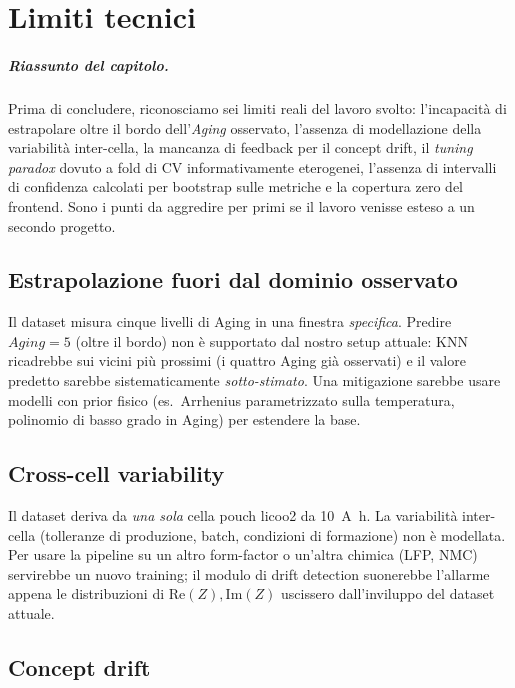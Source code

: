\chapter{Limiti tecnici}
\label{chap:conclusions}

\paragraph{Riassunto del capitolo.} Prima di concludere, riconosciamo
sei limiti reali del lavoro svolto: l'incapacità di estrapolare oltre
il bordo dell'\emph{Aging} osservato, l'assenza di modellazione della
variabilità inter-cella, la mancanza di feedback per il concept drift,
il \emph{tuning paradox} dovuto a fold di CV informativamente
eterogenei, l'assenza di intervalli di confidenza calcolati per
bootstrap sulle metriche e la copertura zero del frontend. Sono i punti
da aggredire per primi se il lavoro venisse esteso a un secondo
progetto.

\section{Estrapolazione fuori dal dominio osservato}

Il dataset misura cinque livelli di Aging in una finestra
\emph{specifica}. Predire $Aging = 5$ (oltre il bordo) non è supportato
dal nostro setup attuale: KNN ricadrebbe sui vicini più prossimi (i
quattro Aging già osservati) e il valore predetto sarebbe
sistematicamente \emph{sotto-stimato}. Una mitigazione sarebbe usare
modelli con prior fisico (es.~Arrhenius parametrizzato sulla
temperatura, polinomio di basso grado in Aging) per estendere la base.

\section{Cross-cell variability}

Il dataset deriva da \emph{una sola} cella pouch \acrshort{licoo2} da
\SI{10}{\ampere\hour}. La variabilità inter-cella (tolleranze di
produzione, batch, condizioni di formazione) non è modellata. Per usare
la pipeline su un altro form-factor o un'altra chimica (LFP, NMC)
servirebbe un nuovo training; il modulo di drift detection suonerebbe
l'allarme appena le distribuzioni di $\mathrm{Re}(Z), \mathrm{Im}(Z)$
uscissero dall'inviluppo del dataset attuale.

\section{Concept drift}

